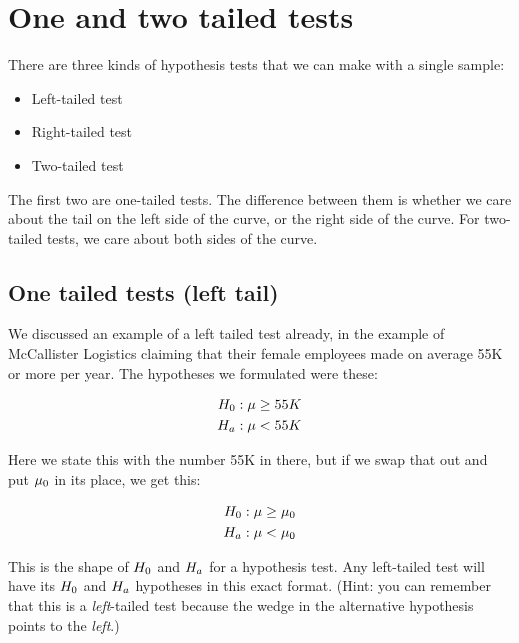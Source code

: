 \documentclass[../../../main.tex]{subfiles}
\begin{document}
\chapter{One and two tailed tests}

There are three kinds of hypothesis tests that we can make with a single sample:

\begin{itemize}
  \item Left-tailed test
  \item Right-tailed test
  \item Two-tailed test
\end{itemize}

\noindent
The first two are one-tailed tests. The difference between them is whether we care about the tail on the left side of the curve, or the right side of the curve. For two-tailed tests, we care about both sides of the curve.


\section{One tailed tests (left tail)}

We discussed an example of a left tailed test already, in the example of McCallister Logistics claiming that their female employees made on average 55K or more per year. The hypotheses we formulated were these:

\begin{align*}
  \NullHyp/: \populationmean \geq 55K \\
  \AltHyp/: \populationmean < 55K
\end{align*}

\noindent
Here we state this with the number 55K in there, but if we swap that out and put $\HypPopMean/$ in its place, we get this:

\begin{align*}
  \NullHyp/: \populationmean \geq \HypPopMean/ \\
  \AltHyp/: \populationmean < \HypPopMean/
\end{align*}

\noindent
This is the shape of $\NullHyp/$ and $\AltHyp/$ for a  hypothesis test. Any left-tailed test will have its $\NullHyp/$ and $\AltHyp/$ hypotheses in this exact format. (Hint: you can remember that this is a \emph{left}-tailed test because the wedge in the alternative hypothesis points to the \emph{left}.)
\end{document}
